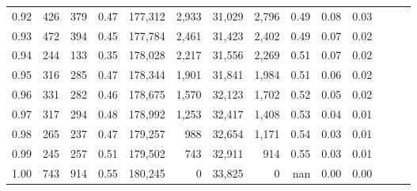 \begin{tabular}{rrrrrrrrrrrrrr}
0.92 &    426 &  379 &  0.47 &  177,312 &    2,933 &  31,029 &   2,796 &  0.49 &  0.08 &      0.03 \\
0.93 &    472 &  394 &  0.45 &  177,784 &    2,461 &  31,423 &   2,402 &  0.49 &  0.07 &      0.02 \\
0.94 &    244 &  133 &  0.35 &  178,028 &    2,217 &  31,556 &   2,269 &  0.51 &  0.07 &      0.02 \\
0.95 &    316 &  285 &  0.47 &  178,344 &    1,901 &  31,841 &   1,984 &  0.51 &  0.06 &      0.02 \\
0.96 &    331 &  282 &  0.46 &  178,675 &    1,570 &  32,123 &   1,702 &  0.52 &  0.05 &      0.02 \\
0.97 &    317 &  294 &  0.48 &  178,992 &    1,253 &  32,417 &   1,408 &  0.53 &  0.04 &      0.01 \\
0.98 &    265 &  237 &  0.47 &  179,257 &      988 &  32,654 &   1,171 &  0.54 &  0.03 &      0.01 \\
0.99 &    245 &  257 &  0.51 &  179,502 &      743 &  32,911 &     914 &  0.55 &  0.03 &      0.01 \\
1.00 &    743 &  914 &  0.55 &  180,245 &        0 &  33,825 &       0 &   nan &  0.00 &      0.00 \\
\bottomrule
\end{tabular}
